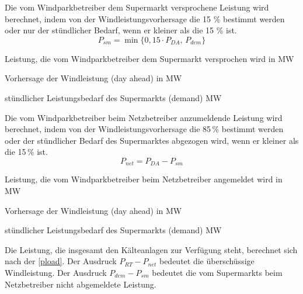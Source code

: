 Die vom Windparkbetreiber dem Supermarkt versprochene Leistung wird berechnet,
indem von der Windleistungsvorhersage die 15 \% bestimmt werden oder nur der
st\"undlicher Bedarf, wenn er kleiner als die 15 \% ist.
\begin{equation*}
	P_{sm} = \min \{ 0,15 \cdot P_{DA},\, P_{dem} \} 
\end{equation*}

\begin{description}[\dth]
	\item[$P_{sm}$] Leistung, die vom Windparkbetreiber dem Supermarkt
	versprochen wird in MW
	\item[$P_{DA}$] Vorhersage der Windleistung (day ahead) in MW
	\item[$P_{dem}$] st\"undlicher Leistungsbedarf des Supermarkts (demand)
	MW
\end{description}
\vspace{0.5cm}

Die vom Windparkbetreiber beim Netzbetreiber anzumeldende Leistung wird
berechnet, indem von der Windleistungsvorhersage die 85\,\% bestimmt werden
oder der st\"undlicher Bedarf des Supermarktes abgezogen wird, wenn er kleiner
als die 15\,\% ist.
\begin{equation*}
	P_{net} = P_{DA} - P_{sm}
\end{equation*}

\begin{description}[\dth]
	\item[$P_{net}$] Leistung, die vom Windparkbetreiber beim Netzbetreiber
	angemeldet wird in MW
	\item[$P_{DA}$] Vorhersage der Windleistung (day ahead) in MW
	\item[$P_{dem}$] st\"undlicher Leistungsbedarf des Supermarkts (demand)
	MW
 \end{description} \vspace{0.5cm}


Die Leistung, die insgesamt den K\"alteanlagen zur Verf\"ugung steht, berechnet
sich nach der \cref{pload}. Der Ausdruck $P_{RT} - P_{net}$ bedeutet die
\"ubersch\"ussige Windleistung. Der Ausdruck $P_{dem} - P_{sm}$  bedeutet die
vom Supermarkts beim Netzbetreiber nicht abgemeldete Leistung.

